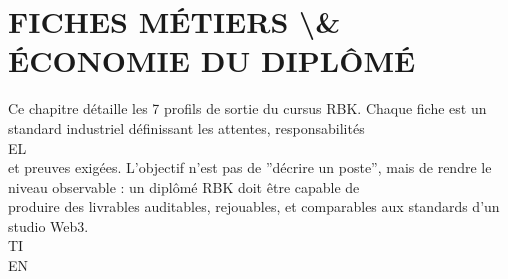 \documentclass[12pt,landscape,a4paper]{article}
\begin{document}
\section{FICHES MÉTIERS \textbackslash{}& ÉCONOMIE DU DIPLÔMÉ}
\vspace{0.5em}
\vspace{0.5em}
Ce chapitre détaille les 7 profils de sortie du cursus RBK. Chaque fiche est un standard industriel définissant les attentes, responsabilités\\
\vspace{0.5em}
\vspace{0.5em}
\vspace{0.5em}
\vspace{0.5em}
EL\\
et preuves exigées. L’objectif n’est pas de ”décrire un poste”, mais de rendre le niveau observable : un diplômé RBK doit être capable de\\
produire des livrables auditables, rejouables, et comparables aux standards d’un studio Web3.\\
\vspace{0.5em}
\vspace{0.5em}
\vspace{0.5em}
\vspace{0.5em}
TI\\
EN\\
\end{document}
